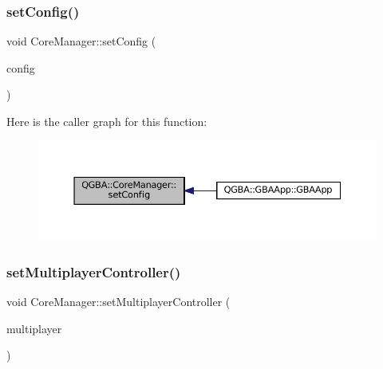 \subsubsection{\texorpdfstring{set\+Config()}{setConfig()}}
{\footnotesize\ttfamily void Core\+Manager\+::set\+Config (\begin{DoxyParamCaption}\item[{const m\+Core\+Config $\ast$}]{config }\end{DoxyParamCaption})}

Here is the caller graph for this function\+:
\nopagebreak
\begin{figure}[H]
\begin{center}
\leavevmode
\includegraphics[width=350pt]{class_q_g_b_a_1_1_core_manager_a2f071a4362e674aa29f19dd7e22fe433_icgraph}
\end{center}
\end{figure}
\mbox{\label{class_q_g_b_a_1_1_core_manager_a3f60ebb15fa19bacc1e441b7c9447cf7}} 
\subsubsection{\texorpdfstring{set\+Multiplayer\+Controller()}{setMultiplayerController()}}
{\footnotesize\ttfamily void Core\+Manager\+::set\+Multiplayer\+Controller (\begin{DoxyParamCaption}\item[{\mbox{\hyperlink{class_q_g_b_a_1_1_multiplayer_controller}{Multiplayer\+Controller}} $\ast$}]{multiplayer }\end{DoxyParamCaption})}

